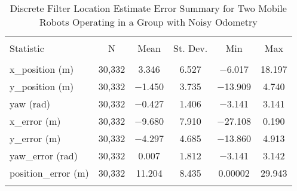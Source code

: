 
\begin{table}[htbp] \centering 
  \caption{Discrete Filter Location Estimate Error Summary for Two Mobile Robots Operating in a Group with Noisy Odometry} 
  \label{tab:two_mobile_no_gps_discrete_summary} 
\begin{tabular}{@{\extracolsep{5pt}}lccccc} 
\\[-1.8ex]\hline 
\hline \\[-1.8ex] 
Statistic & \multicolumn{1}{c}{N} & \multicolumn{1}{c}{Mean} & \multicolumn{1}{c}{St. Dev.} & \multicolumn{1}{c}{Min} & \multicolumn{1}{c}{Max} \\ 
\hline \\[-1.8ex] 
x\_position (m) & 30,332 & \num{3.346} & \num{6.527} & $-$6.017 & \num{18.197} \\ 
y\_position (m) & 30,332 & $-$1.450 & \num{3.735} & $-$13.909 & \num{4.740} \\ 
yaw (rad) & 30,332 & $-$0.427 & \num{1.406} & $-$3.141 & \num{3.141} \\ 
x\_error (m) & 30,332 & $-$9.680 & \num{7.910} & $-$27.108 & \num{0.190} \\ 
y\_error (m) & 30,332 & $-$4.297 & \num{4.685} & $-$13.860 & \num{4.913} \\ 
yaw\_error (rad)& 30,332 & \num{0.007} & \num{1.812} & $-$3.141 & \num{3.142} \\
position\_error (m) & 30,332 & \num{11.204} & \num{8.435} & \num{0.00002} & \num{29.943} \\  
\hline \\[-1.8ex] 
\end{tabular} 
\end{table} 
